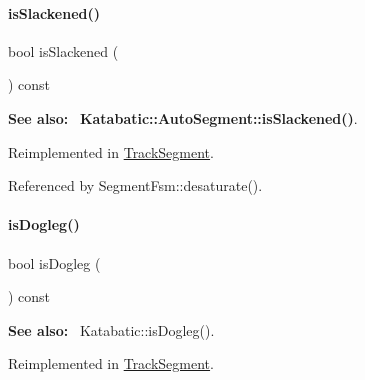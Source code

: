 \mbox{\label{classKite_1_1TrackElement_a782cff57d3fe10e758d19ee65a06643d}} 
\paragraph{\texorpdfstring{is\+Slackened()}{isSlackened()}}
{\footnotesize\ttfamily bool is\+Slackened (\begin{DoxyParamCaption}{ }\end{DoxyParamCaption}) const\hspace{0.3cm}{\ttfamily [virtual]}}

{\bfseries See also\+:}~ \textbf{ Katabatic\+::\+Auto\+Segment\+::is\+Slackened()}. 

Reimplemented in \hyperlink{classKite_1_1TrackSegment_a782cff57d3fe10e758d19ee65a06643d}{Track\+Segment}.



Referenced by Segment\+Fsm\+::desaturate().

\mbox{\label{classKite_1_1TrackElement_a75d91371e5281dd21f60ff39ae70a3e5}} 
\paragraph{\texorpdfstring{is\+Dogleg()}{isDogleg()}}
{\footnotesize\ttfamily bool is\+Dogleg (\begin{DoxyParamCaption}{ }\end{DoxyParamCaption}) const\hspace{0.3cm}{\ttfamily [virtual]}}

{\bfseries See also\+:}~ Katabatic\+::is\+Dogleg(). 

Reimplemented in \hyperlink{classKite_1_1TrackSegment_a75d91371e5281dd21f60ff39ae70a3e5}{Track\+Segment}.

\mbox{\label{classKite_1_1TrackElement_af7d9cf1d7581b1cab04cf38c64f0f72a}} 
